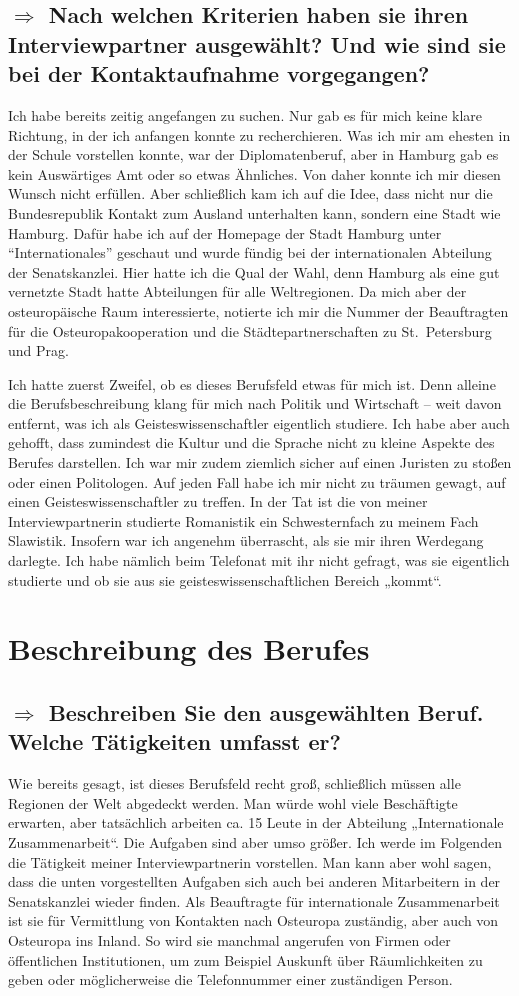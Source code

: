 \documentclass{../../sem_paper}
\newcommand\quest[1]{\subsection*{$\Rightarrow$ #1}}
\begin{document}
\quest{Nach welchen Kriterien haben sie ihren Interviewpartner ausgewählt? Und wie sind sie bei der Kontaktaufnahme vorgegangen?}
Ich habe bereits zeitig angefangen zu suchen. Nur gab es für mich keine klare Richtung, in der ich anfangen konnte zu recherchieren. Was ich mir am ehesten in der Schule vorstellen konnte, war der Diplomatenberuf, aber in Hamburg gab es kein Auswärtiges Amt oder so etwas Ähnliches. Von daher konnte ich mir diesen Wunsch nicht erfüllen. Aber schließlich kam ich auf die Idee, dass nicht nur die Bundesrepublik Kontakt zum Ausland unterhalten kann, sondern eine Stadt wie Hamburg. Dafür habe ich auf der Homepage der Stadt Hamburg unter "`Internationales"' geschaut und wurde fündig bei der internationalen Abteilung der Senatskanzlei. Hier hatte ich die Qual der Wahl, denn Hamburg als eine gut vernetzte Stadt hatte Abteilungen für alle Weltregionen.
Da mich aber der osteuropäische Raum interessierte, notierte ich mir die Nummer der Beauftragten für die Osteuropakooperation und die Städtepartnerschaften zu St.\ Petersburg und Prag.

Ich hatte zuerst Zweifel, ob es dieses Berufsfeld etwas für mich ist. Denn alleine die Berufsbeschreibung klang für mich nach Politik und Wirtschaft -- weit davon entfernt, was ich als Geisteswissenschaftler eigentlich studiere. Ich habe aber auch gehofft, dass zumindest die Kultur und die Sprache nicht zu kleine Aspekte des Berufes darstellen.
Ich war mir zudem ziemlich sicher auf einen Juristen zu stoßen oder einen Politologen. Auf jeden Fall habe ich mir nicht zu träumen gewagt, auf einen Geisteswissenschaftler zu treffen. In der Tat ist die von meiner Interviewpartnerin studierte Romanistik  ein Schwesternfach zu meinem Fach Slawistik. 
Insofern war ich angenehm überrascht, als sie mir ihren Werdegang darlegte. Ich habe nämlich beim Telefonat mit ihr nicht gefragt, was sie eigentlich studierte und ob sie aus sie geisteswissenschaftlichen Bereich „kommt“.

\section{Beschreibung des Berufes}

\quest{Beschreiben Sie den ausgewählten Beruf. Welche Tätigkeiten umfasst er?}
Wie bereits gesagt, ist dieses Berufsfeld recht groß, schließlich müssen alle Regionen der Welt abgedeckt werden. Man würde wohl viele Beschäftigte erwarten, aber tatsächlich arbeiten ca. 15 Leute  in der Abteilung „Internationale Zusammenarbeit“. Die Aufgaben sind aber umso größer. Ich werde im Folgenden die Tätigkeit meiner Interviewpartnerin vorstellen. Man kann aber wohl sagen, dass die unten vorgestellten Aufgaben sich auch bei anderen Mitarbeitern in der Senatskanzlei wieder finden.
Als Beauftragte für internationale Zusammenarbeit ist sie für Vermittlung von Kontakten nach Osteuropa zuständig, aber auch von Osteuropa ins Inland. So wird sie manchmal angerufen von Firmen oder öffentlichen Institutionen, um zum Beispiel Auskunft über Räumlichkeiten zu geben oder möglicherweise die Telefonnummer einer zuständigen Person.
\end{document}
